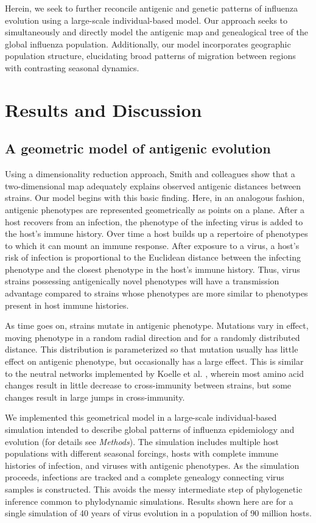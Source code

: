 \documentclass[11pt,oneside,letterpaper]{article}
\begin{document}
Herein, we seek to further reconcile antigenic and genetic patterns of influenza evolution using a large-scale individual-based model.  Our approach seeks to simultaneously and directly model the antigenic map and genealogical tree of the global influenza population.  Additionally, our model incorporates geographic population structure, elucidating broad patterns of migration between regions with contrasting seasonal dynamics.

\section*{Results and Discussion}

\subsection*{A geometric model of antigenic evolution}

Using a dimensionality reduction approach, Smith and colleagues \cite{Smith04} show that a two-dimensional map adequately explains observed antigenic distances between strains.  Our model begins with this basic finding.  Here, in an analogous fashion, antigenic phenotypes are represented geometrically as points on a plane.  After a host recovers from an infection, the phenotype of the infecting virus is added to the host's immune history.  Over time a host builds up a repertoire of phenotypes to which it can mount an immune response.  After exposure to a virus, a host's risk of infection is proportional to the Euclidean distance between the infecting phenotype and the closest phenotype in the host's immune history.  Thus, virus strains possessing antigenically novel phenotypes will have a transmission advantage compared to strains whose phenotypes are more similar to phenotypes present in host immune histories.

As time goes on, strains mutate in antigenic phenotype.  Mutations vary in effect, moving phenotype in a random radial direction and for a randomly distributed distance.  This distribution is parameterized so that mutation usually has little effect on antigenic phenotype, but occasionally has a large effect.  This is similar to the neutral networks implemented by Koelle et al. \cite{Koelle06}, wherein most amino acid changes result in little decrease to cross-immunity between strains, but some changes result in large jumps in cross-immunity.

We implemented this geometrical model in a large-scale individual-based simulation intended to describe global patterns of influenza epidemiology and evolution (for details see \textsl{Methods}).  The simulation includes multiple host populations with different seasonal forcings, hosts with complete immune histories of infection, and viruses with antigenic phenotypes.  As the simulation proceeds, infections are tracked and a complete genealogy connecting virus samples is constructed.  This avoids the messy intermediate step of phylogenetic inference common to phylodynamic simulations.  Results shown here are for a single simulation of 40 years of virus evolution in a population of 90 million hosts.  
\end{document}
